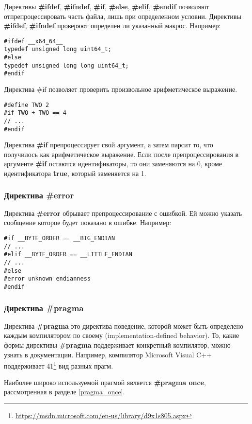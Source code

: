 Директивы {\bf \#ifdef}, {\bf \#ifndef}, {\bf \#if}, {\bf \#else}, {\bf \#elif}, {\bf \#endif} позволяют отпрепроцессировать часть файла, лишь при определенном условии. Директивы {\bf \#ifdef}, {\bf \#ifndef} проверяют определен ли указанный макрос. Например:
\begin{verbatim}
#ifdef __x64_64__
typedef unsigned long uint64_t;
#else
typedef unsigned long long uint64_t;
#endif
\end{verbatim}

Директива \#if позволяет проверить произвольное арифметическое выражение.
\begin{verbatim}
#define TWO 2
#if TWO + TWO == 4
// ...
#endif
\end{verbatim}
Директива {\bf \#if} препроцессирует свой аргумент, а затем парсит то, что получилось как арифметическое выражение. Если после препроцессирования в аргументе {\bf \#if} остаются идентификаторы, то они заменяются на 0, кроме идентификатора {\bf true}, который заменяется на 1.

\subsubsection{Директива \#error}

Директива {\bf \#error} обрывает препроцессирование с ошибкой. Ей можно указать сообщение которое будет показано в ошибке. Например:
\begin{verbatim}
#if __BYTE_ORDER == __BIG_ENDIAN
// ...
#elif __BYTE_ORDER == __LITTLE_ENDIAN
// ...
#else
#error unknown endianness
#endif
\end{verbatim}

\subsubsection{Директива \#pragma}

Директива {\bf \#pragma} это директива поведение, которой может быть определено каждым компилятором по своему (implementation-defined behavior). То, какие формы директивы {\bf \#pragma} поддерживает конкретный компилятор, можно узнать в документации. Например, компилятор Microsoft Visual C++ поддерживает 41\footnote{\url{https://msdn.microsoft.com/en-us/library/d9x1s805.aspx}} вид разных прагм.

Наиболее широко используемой прагмой является {\bf \#pragma once}, рассмотренная в разделе \ref{pragma_once}.

